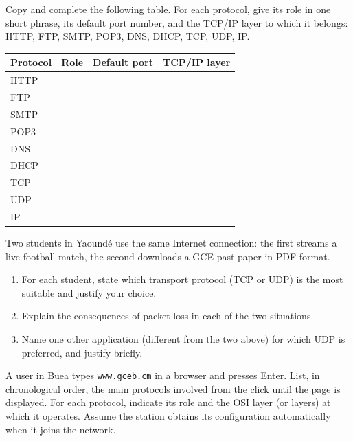 \documentclass[11pt]{article}
\newcounter{popsec}
\newcounter{popsub}
\newcommand{\courssub}[1]{%
  \stepcounter{popsub}%
  \par\vspace{9pt}\noindent{\popxbold\fontsize{11.5}{13}\selectfont\color{popink}{\color{poporange}\thepopsec.\thepopsub}\hspace{6pt}#1}\par\nopagebreak\vspace{4pt}
}
\begin{document}
\courssub{I practise}

\begin{exercice}
Copy and complete the following table. For each protocol, give its role in one short phrase, its default port number, and the TCP/IP layer to which it belongs: HTTP, FTP, SMTP, POP3, DNS, DHCP, TCP, UDP, IP.
\begin{center}
\begin{tabularx}{\linewidth}{|l|X|l|l|}
\hline
\rowcolor{popblueL} \textbf{Protocol} & \textbf{Role} & \textbf{Default port} & \textbf{TCP/IP layer} \\
\hline
HTTP & & & \\
\hline
FTP & & & \\
\hline
SMTP & & & \\
\hline
POP3 & & & \\
\hline
DNS & & & \\
\hline
DHCP & & & \\
\hline
TCP & & & \\
\hline
UDP & & & \\
\hline
IP & & & \\
\hline
\end{tabularx}
\end{center}
\end{exercice}

\begin{exercice}
Two students in Yaoundé use the same Internet connection: the first streams a live football match, the second downloads a GCE past paper in PDF format.
\begin{enumerate}
\item For each student, state which transport protocol (TCP or UDP) is the most suitable and justify your choice.
\item Explain the consequences of packet loss in each of the two situations.
\item Name one other application (different from the two above) for which UDP is preferred, and justify briefly.
\end{enumerate}
\end{exercice}

\begin{exercice}
A user in Buea types \texttt{www.gceb.cm} in a browser and presses Enter. List, in chronological order, the main protocols involved from the click until the page is displayed. For each protocol, indicate its role and the OSI layer (or layers) at which it operates. Assume the station obtains its configuration automatically when it joins the network.
\end{exercice}
\end{document}

